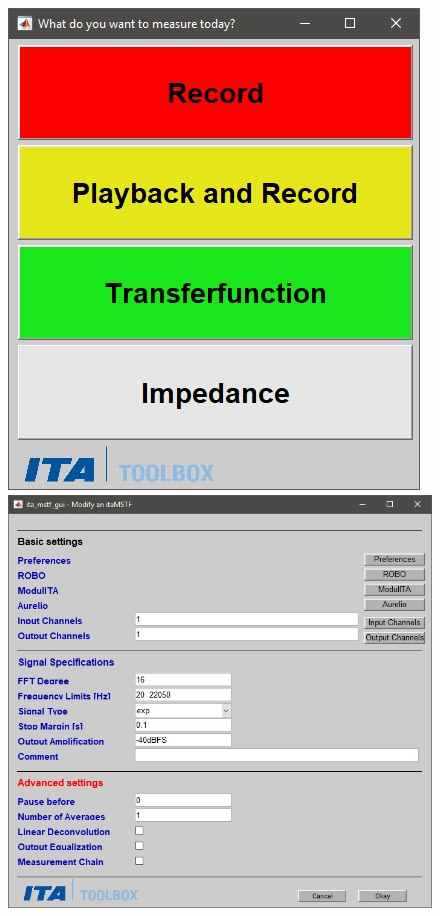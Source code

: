 \documentclass[12pt, a4paper, twoside, onecolumn]{article}%
\begin{document}
\begin{figure}[H] \centering
\includegraphics[width=.4\textwidth]{Figures/E22.jpg}
\includegraphics[width=.5\textwidth]{Figures/E23.jpg}
\end{figure}
\pagebreak
\end{document}
